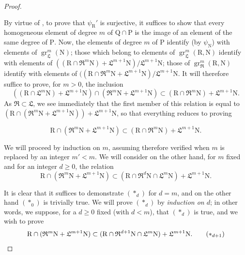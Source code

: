 \begin{proof}
\begin{env}[19.7.1.5]
\label{IV.19.7.1.5}
By virtue of , to prove that $\psi_\mathrm{R}'$ is surjective, it suffices to show that every homogeneous element of degree $m$ of $\mathrm{Q}\cap\mathrm{P}$ is the image of an element of the same degree of $\mathrm{P}$. Now, the elements of degree $m$ of $\mathrm{P}$ identify (by $\psi_\mathrm{N}$) with elements of $\operatorname{gr}_\mathfrak{L}^m(\mathrm{N})$; those which belong to elements of $\operatorname{gr}_\mathfrak{L}^m(\mathrm{R},\mathrm{N})$ identify with elements of $((\mathrm{R}\cap\mathfrak{R}^m\mathrm{N})+\mathfrak{L}^{m+1}\mathrm{N})/\mathfrak{L}^{m+1}\mathrm{N}$; those of $\operatorname{gr}_\mathfrak{R}^m(\mathrm{R},\mathrm{N})$ identify with elements of $((\mathrm{R}\cap\mathfrak{R}^m\mathrm{N}+\mathfrak{L}^{m+1}\mathrm{N})/\mathfrak{L}^{m+1}\mathrm{N}$. It will therefore suffice to prove, for $m>0$, the inclusion
\[
  ((\mathrm{R}\cap\mathfrak{L}^m\mathrm{N})+\mathfrak{L}^{m+1}\mathrm{N})\cap(\mathfrak{R}^m\mathrm{N}+\mathfrak{L}^{m+1}\mathrm{N})\subset(\mathrm{R}\cap\mathfrak{R}^m\mathrm{N})+\mathfrak{L}^{m+1}\mathrm{N}.
\]
As $\mathfrak{R}\subset\mathfrak{L}$, we see immediately that the first member of this relation is equal to $(\mathrm{R}\cap(\mathfrak{R}^m\mathrm{N}+\mathfrak{L}^{m+1}\mathrm{N}))+\mathfrak{L}^{m+1}\mathrm{N}$, so that everything reduces to proving
\end{env}
\begin{env}[19.7.1.6]
\label{IV.19.7.1.6}
\[
  \mathrm{R}\cap(\mathfrak{R}^m\mathrm{N}+\mathfrak{L}^{m+1}\mathrm{N})\subset(\mathrm{R}\cap\mathfrak{R}^m\mathrm{N})+\mathfrak{L}^{m+1}\mathrm{N}.
\]
\end{env}

We will proceed by induction on $m$, assuming therefore  verified when $m$ is replaced by an integer $m'<m$. We will consider on the other hand, for $m$ fixed and for an integer $d\geqslant 0$, the relation
\begin{equation}
  \mathrm{R}\cap(\mathfrak{R}^m\mathrm{N}+\mathfrak{L}^{m+1}\mathrm{N})\subset(\mathrm{R}\cap\mathfrak{R}^d\mathrm{N}\cap\mathfrak{L}^m\mathrm{N})+\mathfrak{L}^{m+1}\mathrm{N}.
  \tag{$*_d$}
\end{equation}

It is clear that it suffices to demonstrate $(*_d)$ for $d=m$, and on the other hand $(*_0)$ is trivially true. We will prove $(*_d)$ by \emph{induction on $d$}; in other words, we suppose, for a $d\geqslant 0$ fixed (with $d<m$), that $(*_d)$ is true, and we wish to prove
\begin{equation}
  \mathrm{R}\cap(\mathfrak{R}^m\mathrm{N}+\mathfrak{L}^{m+1}\mathrm{N})\subset(\mathrm{R}\cap\mathfrak{R}^{d+1}\mathrm{N}\cap\mathfrak{L}^m\mathrm{N})+\mathfrak{L}^{m+1}\mathrm{N}.
  \tag{$*_{d+1}$}
\end{equation}


\end{proof}
